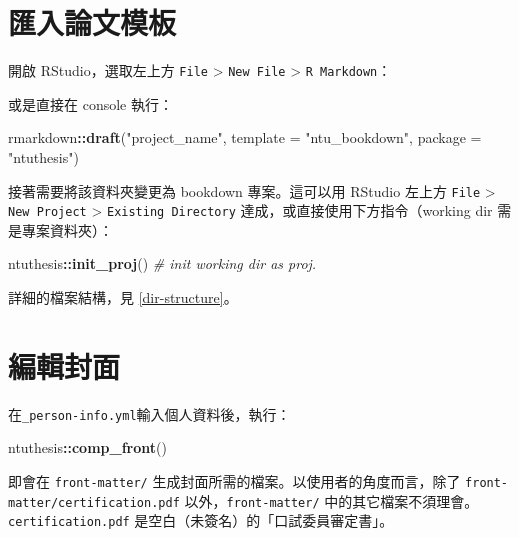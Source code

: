 \documentclass[oneside]{book}
\newenvironment{Shaded}{\begin{snugshade}}{\end{snugshade}}
\newcommand{\CommentTok}[1]{\textcolor[rgb]{0.56,0.35,0.01}{\textit{#1}}}
\newcommand{\DataTypeTok}[1]{\textcolor[rgb]{0.13,0.29,0.53}{#1}}
\newcommand{\KeywordTok}[1]{\textcolor[rgb]{0.13,0.29,0.53}{\textbf{#1}}}
\newcommand{\NormalTok}[1]{#1}
\newcommand{\OperatorTok}[1]{\textcolor[rgb]{0.81,0.36,0.00}{\textbf{#1}}}
\newcommand{\StringTok}[1]{\textcolor[rgb]{0.31,0.60,0.02}{#1}}
\begin{document}
\hypertarget{import-template}{%
\section{匯入論文模板}\label{import-template}}

開啟 RStudio，選取左上方 \texttt{File} \textgreater{} \texttt{New\ File} \textgreater{} \texttt{R\ Markdown}：

或是直接在 console 執行：

\begin{Shaded}
\begin{Highlighting}[]
\NormalTok{rmarkdown}\OperatorTok{::}\KeywordTok{draft}\NormalTok{(}\StringTok{"project_name"}\NormalTok{,}
                 \DataTypeTok{template =} \StringTok{"ntu_bookdown"}\NormalTok{,}
                 \DataTypeTok{package =} \StringTok{"ntuthesis"}\NormalTok{)}
\end{Highlighting}
\end{Shaded}

接著需要將該資料夾變更為 bookdown 專案。這可以用 RStudio 左上方 \texttt{File} \textgreater{} \texttt{New\ Project} \textgreater{} \texttt{Existing\ Directory} 達成，或直接使用下方指令（working dir 需是專案資料夾）：

\begin{Shaded}
\begin{Highlighting}[]
\NormalTok{ntuthesis}\OperatorTok{::}\KeywordTok{init_proj}\NormalTok{()  }\CommentTok{# init working dir as proj.}
\end{Highlighting}
\end{Shaded}

詳細的檔案結構，見 \ref{dir-structure}。

\hypertarget{edit-front-matter}{%
\section{編輯封面}\label{edit-front-matter}}

在\texttt{\_person-info.yml}輸入個人資料後，執行：

\begin{Shaded}
\begin{Highlighting}[]
\NormalTok{ntuthesis}\OperatorTok{::}\KeywordTok{comp_front}\NormalTok{()}
\end{Highlighting}
\end{Shaded}

即會在 \texttt{front-matter/} 生成封面所需的檔案。以使用者的角度而言，除了 \texttt{front-matter/certification.pdf} 以外，\texttt{front-matter/} 中的其它檔案不須理會。\texttt{certification.pdf} 是空白（未簽名）的「口試委員審定書」。
\end{document}
